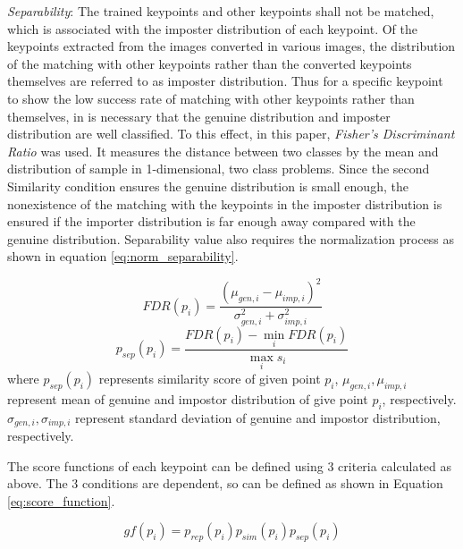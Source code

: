 \textit{Separability}: The trained keypoints and other keypoints shall not be matched, which is associated with the imposter distribution of each keypoint. Of the keypoints extracted from the images converted in various images, the distribution of the matching with other keypoints rather than the converted keypoints themselves are referred to as imposter distribution. Thus for a specific keypoint to show the low success rate of matching with other keypoints rather than themselves, in is necessary that the genuine distribution and imposter distribution are well classified. To this effect, in this paper, \textit{Fisher's Discriminant Ratio\cite{fisher_use_1936}} was used. It measures the distance between two classes by the mean and distribution of sample in 1-dimensional, two class problems. Since the second Similarity condition ensures the genuine distribution is small enough, the nonexistence of the matching with the keypoints in the imposter distribution is ensured if the importer distribution is far enough away compared with the genuine distribution. Separability value also requires the normalization process as shown in equation \eqref{eq:norm_separability}.  


\begin{equation}
FDR(p_i) = \frac{(\mu_{gen,i} - \mu_{imp, i})^2}{\sigma_{gen, i}^2 + \sigma_{imp, i}^2}
\end{equation}
\begin{equation}\label{eq:norm_separability}
p_{sep}(p_i) = \frac{FDR(p_i) - \min_i {FDR(p_i)}}{\max_{i} {s_i}}
\end{equation}	
where $p_{sep}(p_i)$ represents similarity score of given point $p_i$, $\mu_{gen, i}, \mu_{imp, i}$ represent mean of genuine and impostor distribution of give point $p_i$, respectively. $\sigma_{gen,i}, \sigma_{imp, i}$ represent standard deviation of genuine and impostor distribution, respectively.



The score functions of each keypoint can be defined using 3 criteria calculated as above. The 3 conditions are dependent, so can be defined as shown in Equation \eqref{eq:score_function}. 

\begin{equation}\label{eq:score_function}
gf(p_i) = p_{rep}(p_i)p_{sim}(p_i)p_{sep}(p_i)
\end{equation} 




